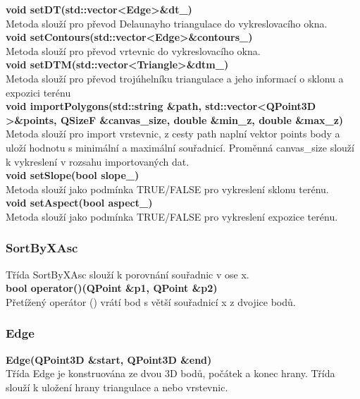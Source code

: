 \documentclass[a4paper, 12pt]{article}
\begin{document}
\textbf{void setDT(std::vector\textless Edge\textgreater \&dt\_)}\\
Metoda slouží pro převod Delaunayho triangulace do vykreslovacího okna.\\

\textbf{void setContours(std::vector\textless Edge\textgreater\&contours\_)}\\
Metoda slouží pro převod vrtevnic do vykreslovacího okna.\\

\textbf{void setDTM(std::vector\textless Triangle\textgreater \&dtm\_)}\\
Metoda slouží pro převod trojúhelníku triangulace a jeho informací o sklonu a expozici terénu\\

\textbf{void importPolygons(std::string \&path, std::vector\textless QPoint3D \textgreater \&points,  QSizeF \&canvas\_size, double \&min\_z, double \&max\_z)}\\
Metoda slouží pro import vrstevnic, z cesty path naplní vektor points body a uloží hodnotu s minimální a maximální souřadnicí. Proměnná canvas\_size slouží k vykreslení v rozsahu importovaných dat.\\

\textbf{void setSlope(bool slope\_)}\\
Metoda slouží jako podmínka TRUE/FALSE pro vykreslení sklonu terénu.\\

\textbf{void setAspect(bool aspect\_)}\\
Metoda slouží jako podmínka TRUE/FALSE pro vykreslení expozice terénu.\\



\subsubsection{SortByXAsc}
Třída SortByXAsc slouží k porovnání souřadnic v ose x.\\


\textbf{bool operator()(QPoint \&p1, QPoint \&p2)}\\
Přetížený operátor () vrátí bod s větší souřadnicí x z dvojice bodů.\\

\subsubsection{Edge}
\textbf{Edge(QPoint3D \&start, QPoint3D \&end)}\\
Třída Edge je konstruována ze dvou 3D bodů, počátek a konec hrany. Třída slouží k uložení hrany triangulace a nebo vrstevnic.\\
    
\end{document}
